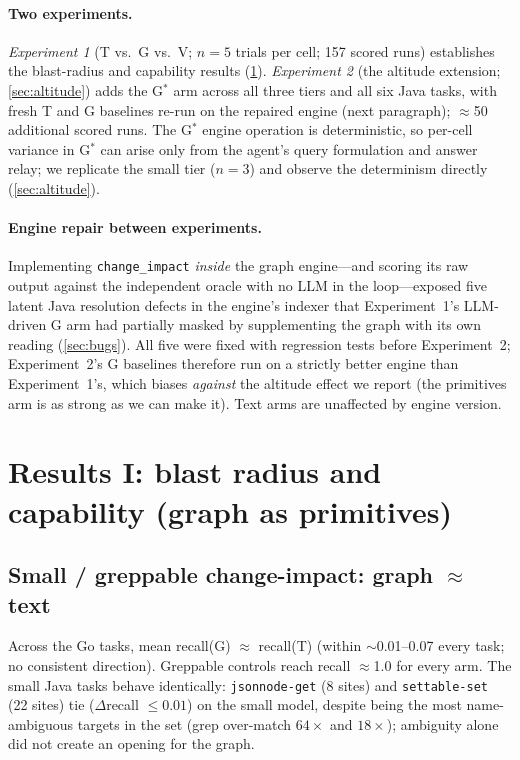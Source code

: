 \documentclass[11pt]{article}
\newcommand{\code}[1]{\texttt{#1}}
\newcommand{\gstar}{G$^{*}$}
\begin{document}
\paragraph{Two experiments.}
\emph{Experiment 1} (T vs.\ G vs.\ V; $n{=}5$ trials per cell; 157 scored runs)
establishes the blast-radius and capability results
(\cref{sec:results-exp1}). \emph{Experiment 2} (the altitude extension;
\cref{sec:altitude}) adds the \gstar{} arm across all three tiers and all six
Java tasks, with fresh T and G baselines re-run on the repaired engine
(next paragraph); $\approx$50 additional scored runs. The \gstar{} engine
operation is deterministic, so per-cell variance in \gstar{} can arise only from
the agent's query formulation and answer relay; we replicate the small tier
($n{=}3$) and observe the determinism directly (\cref{sec:altitude}).

\paragraph{Engine repair between experiments.}
Implementing \code{change\_impact} \emph{inside} the graph engine---and scoring
its raw output against the independent oracle with no LLM in the loop---exposed
five latent Java resolution defects in the engine's indexer that Experiment~1's
LLM-driven G arm had partially masked by supplementing the graph with its own
reading (\cref{sec:bugs}). All five were fixed with regression tests before
Experiment~2; Experiment~2's G baselines therefore run on a strictly better
engine than Experiment~1's, which biases \emph{against} the altitude effect we
report (the primitives arm is as strong as we can make it). Text arms are
unaffected by engine version.

\section{Results I: blast radius and capability (graph as primitives)}
\label{sec:results-exp1}

\subsection{Small / greppable change-impact: graph $\approx$ text}
Across the Go tasks, mean recall(G) $\approx$ recall(T) (within $\sim$0.01--0.07
every task; no consistent direction). Greppable controls reach recall $\approx$1.0
for every arm. The small Java tasks behave identically: \code{jsonnode-get} (8
sites) and \code{settable-set} (22 sites) tie ($\Delta$recall $\le 0.01$) on the
small model, despite being the most name-ambiguous targets in the set
(grep over-match $64\times$ and $18\times$); ambiguity alone did not create
an opening for the graph.
\end{document}
